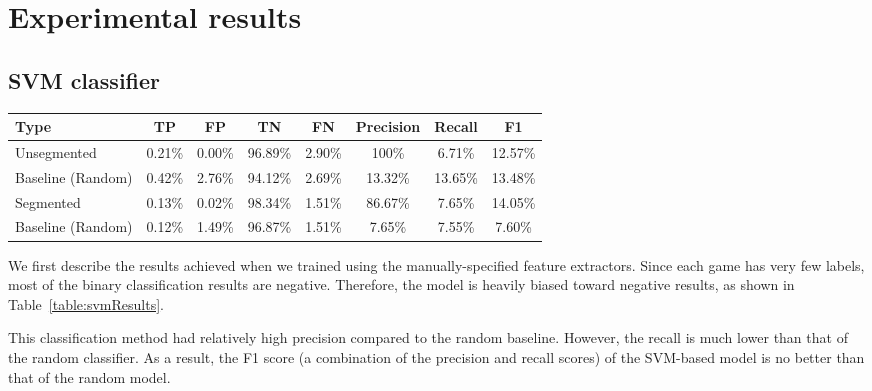 \documentclass[11pt]{article}
\begin{document}
\section{Experimental results}
\subsection{SVM classifier}
\begin{table*}
\centering
\begin{tabular}{lccccccc}
\hline
\textbf{Type} & \textbf{TP} & \textbf{FP} & \textbf{TN} & \textbf{FN} & \textbf{Precision} & \textbf{Recall} & \textbf{F1} \\ \hline
Unsegmented & 0.21\% & 0.00\% & 96.89\% & 2.90\% & 100\% & 6.71\% & 12.57\% \\
Baseline (Random) & 0.42\% & 2.76\% & 94.12\% & 2.69\% & 13.32\% & 13.65\% & 13.48\% \\
\hline
Segmented & 0.13\% & 0.02\% & 98.34\% & 1.51\% & 86.67\% & 7.65\% & 14.05\% \\
Baseline (Random) & 0.12\% & 1.49\% & 96.87\% & 1.51\% & 7.65\% & 7.55\% & 7.60\% \\
\end{tabular} 
\caption{Classification results for the games that have not been segmented by the color of the active player, and those that have been. In the former, precision clearly outperforms a random baseline, but recall falls short, resulting in a lower F1 score. In the latter, precision has fallen relative to the unsegmented version, but recall has risen, resulting in a slightly higher F1 score. In contrast, the random model became much worse in both ways.}
\label{table:svmResults}
\end{table*}

We first describe the results achieved when we trained using the manually-specified feature extractors. Since each game has very few labels, most of the binary classification results are negative. Therefore, the model is heavily biased toward negative results, as shown in Table~\ref{table:svmResults}.

This classification method had relatively high precision compared to the random baseline. However, the recall is much lower than that of the random classifier. As a result, the F1 score (a combination of the precision and recall scores) of the SVM-based model is no better than that of the random model.
\end{document}
